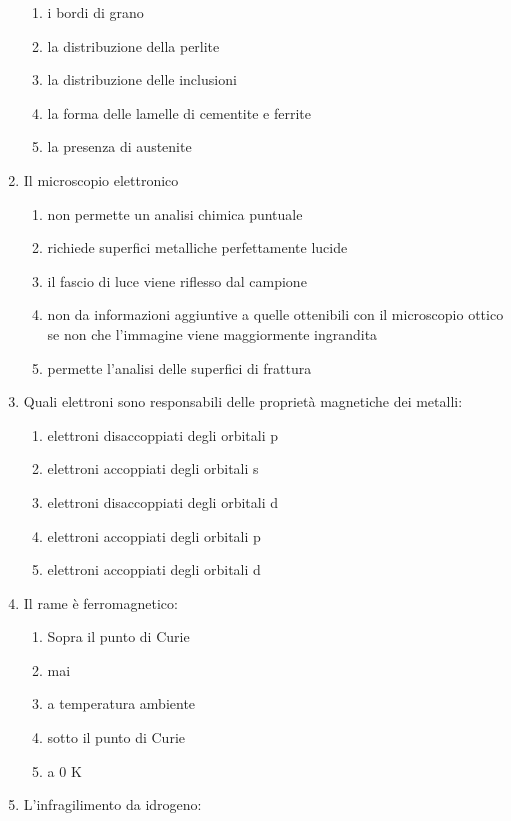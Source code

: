 \begin{enumerate}
\begin{enumerate}
        \item i bordi di grano
        \item la distribuzione della perlite
        \item la distribuzione delle inclusioni 
        \item la forma delle lamelle di cementite e ferrite
        \item la presenza di austenite
    \end{enumerate}
    \item Il microscopio elettronico
    \begin{enumerate}
        \item non permette un analisi chimica puntuale
        \item richiede superfici metalliche perfettamente lucide
        \item il fascio di luce viene riflesso dal campione
        \item non da informazioni aggiuntive a quelle ottenibili con il microscopio ottico se non che l’immagine viene maggiormente ingrandita
        \item permette l’analisi delle superfici di frattura
    \end{enumerate}
    \item Quali elettroni sono responsabili delle proprietà magnetiche dei metalli:
    \begin{enumerate}
        \item elettroni disaccoppiati degli orbitali p
        \item elettroni accoppiati degli orbitali s
        \item elettroni disaccoppiati degli orbitali d
        \item elettroni accoppiati degli orbitali p
        \item elettroni accoppiati degli orbitali d
    \end{enumerate}
    \item Il rame è ferromagnetico:
    \begin{enumerate}
        \item Sopra il punto di Curie
        \item mai
        \item a temperatura ambiente
        \item sotto il punto di Curie
        \item a 0 K
    \end{enumerate}
    \item L’infragilimento da idrogeno:

\end{enumerate}
